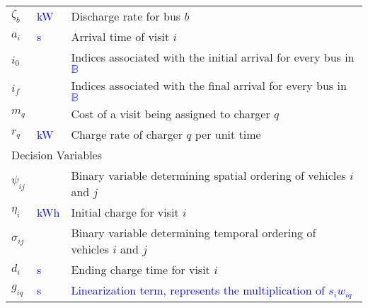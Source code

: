\documentclass[utf8]{FrontiersinHarvard}
\begin{document}
\begin{table}[!htpb]
\begin{tabularx}{\textwidth}{l l l}
    $\zeta_b$                    & \textcolor{blue}{kW}    & Discharge rate for bus $b$                                                                                        \\
    $a_i$                    & \textcolor{blue}{s}     & Arrival time of visit $i$                                                                                         \\
    $i_0$                    &                         & Indices associated with the initial arrival
    for every bus in \textcolor{blue}{$\mathbb{B}$}                                                                                                                        \\
    $i_f$                    &                         & Indices associated with the final arrival for every bus in \textcolor{blue}{$\mathbb{B}$}                         \\
    $m_q$                    &                         & Cost of a visit being assigned to charger $q$                                                                     \\
    $r_q$                    & \textcolor{blue}{kW}    & Charge rate of charger $q$ per unit time                                                                          \\
    \hline \multicolumn{3}{l}{Decision Variables}                                                                                                                          \\
    \hline $\psi_{ij}$          &                         & Binary variable determining spatial ordering of vehicles $i$ and $j$                                              \\
    $\eta_i$                    & \textcolor{blue}{kWh}   & Initial charge for visit $i$                                                                                      \\
    $\sigma_{ij}$                 &                         & Binary variable determining temporal ordering of vehicles $i$ and $j$                                             \\
    $d_i$                    & \textcolor{blue}{s}     & Ending charge time for visit $i$                                                                                  \\
    $g_{iq}$                 & \textcolor{blue}{s}     & \textcolor{blue}{Linearization term, represents the multiplication of $s_i w_{iq}$}                               \\

\end{tabularx}
\end{table}
\end{document}
